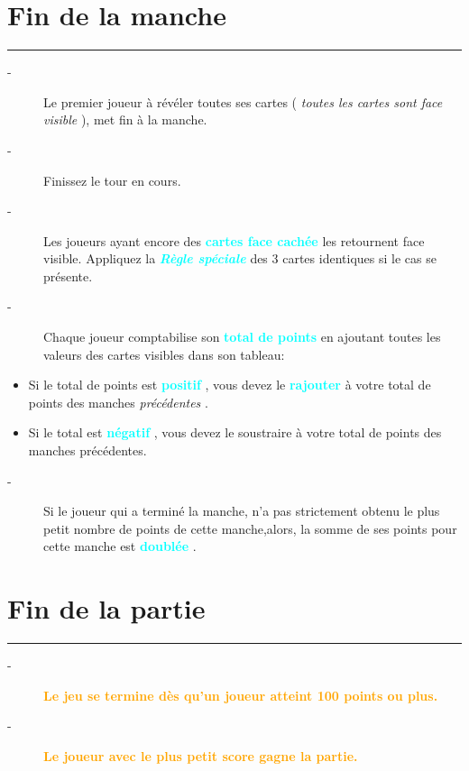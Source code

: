 \documentclass{scrartcl}%
\begin{document}
%
\sectionfont{\color{cyan}}%
\subsectionfont{\color{cyan}}%
\subsubsectionfont{\color{cyan}}%
\section{ Fin de la manche
}%
\label{sec:Findelamanche}%
\textcolor{cyan}{\rule{18cm}{0.07cm}}\break%
\begin{description}%
\item[{-} ]%
%
Le premier joueur à révéler toutes ses cartes (%
\textit{toutes les cartes sont face visible}%
), met fin à la manche.
%
\item[{-} ]%
%
 Finissez le tour en cours.
%
\item[{-} ]%
%
 Les joueurs ayant encore des %
\textcolor{cyan}{%
\textbf{cartes face cachée}%
}%
\textit{ }%
 les retournent face visible. Appliquez la %
\textcolor{cyan}{\textbf{\textit{Règle spéciale}}}%
\textit{ }%
 des 3 cartes identiques si le cas se présente.
%
\item[{-} ]%
%
 Chaque joueur comptabilise son %
\textcolor{cyan}{%
\textbf{total de points}%
}%
\textit{ }%
 en ajoutant toutes les valeurs des cartes visibles dans son tableau:
%
\end{description}%
\begin{itemize}%
\item%
%
 Si le total de points est %
\textcolor{cyan}{%
\textbf{positif}%
}%
, vous devez le %
\textcolor{cyan}{%
\textbf{rajouter}%
}%
\textit{ }%
 à votre total de points des manches %
\textit{précédentes}%
.
%
\item%
%
 Si le total est %
\textcolor{cyan}{%
\textbf{négatif}%
}%
, vous devez le soustraire à votre total de points des manches précédentes.
%
\end{itemize}%
\begin{description}%
\item[{-} ]%
%
Si le joueur qui a terminé la manche, n’a pas strictement obtenu le plus petit nombre de points de cette manche,alors, la somme de ses points pour cette manche est %
\textcolor{cyan}{%
\textbf{doublée}%
}%
.
%
\end{description}

%
\sectionfont{\color{orange}}%
\subsectionfont{\color{orange}}%
\subsubsectionfont{\color{orange}}%
\section{ Fin de la partie
}%
\label{sec:Findelapartie}%
\textcolor{orange}{\rule{18cm}{0.07cm}}\break%
\begin{description}%
\item[{-} ]%
%
\textcolor{orange}{%
\textbf{Le jeu se termine dès qu’un joueur atteint 100 points ou plus.}%
}%

%
\item[{-} ]%
%
\textcolor{orange}{%
\textbf{Le joueur avec le plus petit score gagne la partie.}%
}%
\end{description}

%
\end{document}
